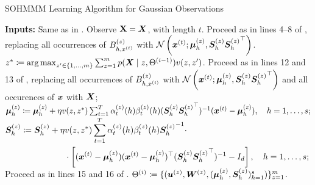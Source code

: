 \begin{algorithm}
	\caption{SOHMMM Learning Algorithm for Gaussian Observations}
	\label{alg:sohmmm_gaussian}
	
	\begin{algorithmic}[1]
		\State \textbf{Inputs:} Same as in .
		\vspace{0.3cm}
		\vspace{0.3cm}
		\State Observe ${\mathbf{X}} = {\bm{X}}$, with length $t$.
		\vspace{0.3cm}
		\State Proceed as in lines 4--8 of , replacing all occurrences of ${B}^{(z)}_{h,x^{(t)}}$ with $\mathcal{N}\left({\bm{x}}^{(t)}; {\bm{\mu}}^{(z)}_h, {\bm{S}}^{(z)}_h {{\bm{S}}^{(z)}_h}^\top\right)$.
		\vspace{0.3cm}
		\State $z^* \coloneqq  \operatorname*{arg\,max}_{z' \in \{1,\dots,m\}} \sum_{z=1}^m p({\bm{X}} \mid z, \Theta^{(i-1)})v(z, z')$.
		\vspace{0.3cm}
		\vspace{0.3cm}
		\State Proceed as in lines 12 and 13 of , replacing all occurrences of ${B}^{(z)}_{h,x^{(t)}}$ with $\mathcal{N}\left({\bm{x}}^{(t)}; {\bm{\mu}}^{(z)}_h, {\bm{S}}^{(z)}_h {{\bm{S}}^{(z)}_h}^\top\right)$ and all occurences of ${\bm{x}}$ with ${\bm{X}}$;
		\vspace{0.3cm}
		\State ${\bm{\mu}}^{(z)}_h \coloneqq {\bm{\mu}}^{(z)}_h + \eta v(z, z^*) \sum_{t=1}^T \alpha_{t}^{(z)}(h) \beta_{t}^{(z)}(h) ({\bm{S}}^{(z)}_h {{\bm{S}}^{(z)}_h} ^\top)^{-1} ({\bm{x}}^{(t)} - {\bm{\mu}}^{(z)}_h), \quad h = 1, \dots, s;$
		\vspace{0.3cm}
		\State $\begin{aligned}
			{\bm{S}}^{(z)}_h \coloneqq {\bm{S}}^{(z)}_h + \eta &v(z, z^*) \sum_{t=1}^T \alpha_{t}^{(z)}(h) \beta_{t}^{(z)}(h) {{\bm{S}}^{(z)}_h}^{-1} \cdot \\
			&\cdot \left[ ({\bm{x}}^{(t)} - {\bm{\mu}}^{(z)}_h) ({\bm{x}}^{(t)} - {\bm{\mu}}^{(z)}_h)^\top ({\bm{S}}^{(z)}_h {{\bm{S}}^{(z)}_h} ^\top)^{-1} - I_d\right], \quad h = 1, \dots, s;
			\end{aligned}$
		\vspace{0.3cm}
		\State Proceed as in lines 15 and 16 of .
		\vspace{0.3cm}
		\EndFor
		\vspace{0.3cm}
		\State $\Theta^{(i)} \coloneqq \lbrace ({\bm{u}}^{(z)}, {\bm{W}}^{(z)}, ({\bm{\mu}}^{(z)}_h, {\bm{S}}^{(z)}_h)_{h=1}^s) \rbrace_{z=1}^m$.
		\vspace{0.3cm}
		\EndFor
		
	\end{algorithmic}
\end{algorithm}

